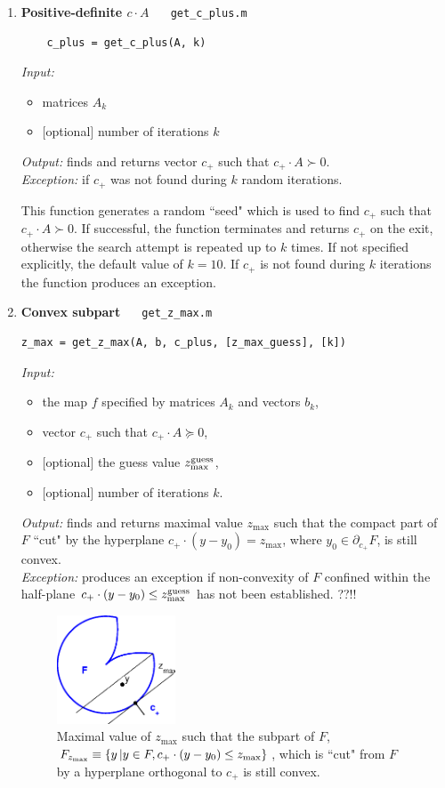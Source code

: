 \documentclass[a4paper]{article}
\theoremstyle{definition}
\begin{document}
\begin{enumerate}
\item {\bf Positive-definite $c\cdot A$\ \ \ }{\tt get\_c\_plus.m}
\begin{verbatim}
	c_plus = get_c_plus(A, k)
\end{verbatim}

{\it Input:}
\begin{itemize}
	\item matrices $A_k$
	\item $[$optional$]$ number of iterations $k$
\end{itemize}
{\it Output:} finds and returns vector $c_+$ such that $c_+\cdot A\succ 0$.\\
{\it Exception:} if $c_+$  was not found during $k$ random iterations.

	
	This function generates a random ``seed" which is used to find $c_+$ such that $c_+\cdot A\succ 0$. If successful, the function terminates and returns $c_+$ on the exit, otherwise the search attempt is repeated up to $k$ times. If not specified explicitly, the default value of $k=10$. If $c_+$ is not found during $k$ iterations the function produces an exception. 
	
\item {\bf Convex subpart\ \ \ }{\tt get\_z\_max.m}
\begin{verbatim}
z_max = get_z_max(A, b, c_plus, [z_max_guess], [k])
\end{verbatim}
{\it Input:}
\begin{itemize}
	\item the map $f$ specified by matrices $A_k$ and vectors $b_k$,
	\item vector $c_+$ such that $c_+\cdot A\succeq 0$,
	\item $[$optional$]$ the guess value  $z^{\rm guess}_{\rm max}$,
	\item $[$optional$]$ number of iterations $k$.
\end{itemize}
{\it Output:} finds and returns maximal value $z_{\max}$ such that the compact part of $F$ ``cut" by the hyperplane  $c_+ \cdot (y-y_0)=z_{\max}$, where $y_0\in \partial_{c_+}F$, is still convex. \\
{\it Exception:} produces an exception if non-convexity of $F$ confined within the half-plane $c_+ \cdot (y-y_0)\leq z^{\rm guess}_{\rm max}$  has not been established.  ??!!

\begin{figure}[H]
	\centering\includegraphics[width=100pt]{fig/get_z_max}
	\caption{Maximal value of $z_{\max}$ such that  the subpart of $F$, $F_{z_{\rm max}}\equiv \{y\, | y\in F, c_+ \cdot (y-y_0)\leq z_{\rm max}\}$, which is ``cut" from $F$ by a hyperplane orthogonal  to $c_+$ is still convex.}
\label{fig:four}
\end{figure}




\end{enumerate}
\end{document}
